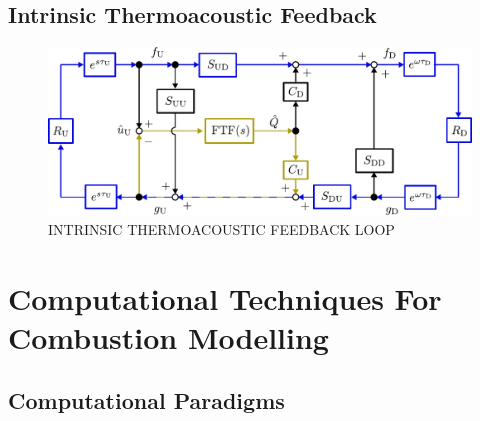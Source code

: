 






\subsection{Intrinsic Thermoacoustic Feedback}

\begin{figure}[t]
\centering
\includegraphics[scale=0.65]{assets/imgs/ITA-mech.pdf}
\caption{INTRINSIC THERMOACOUSTIC FEEDBACK LOOP}
\label{fig:ita-loop}
\end{figure}



\cite{emmert2015IntrinsicThermoacousticInstability}
\cite{silva2023IntrinsicThermoacousticInstabilities}
\cite{hoeijmakers2014IntrinsicInstabilityFlame}
\cite{hoeijmakers2016FlameDominatedThermoacoustic}
\cite{orchini2025TrackingAcousticIntrinsic}
\cite{chen2024BiglobalLinearStability}






\section[Computational Combustion Modelling]{Computational Techniques For Combustion Modelling}

\subsection{Computational Paradigms}

